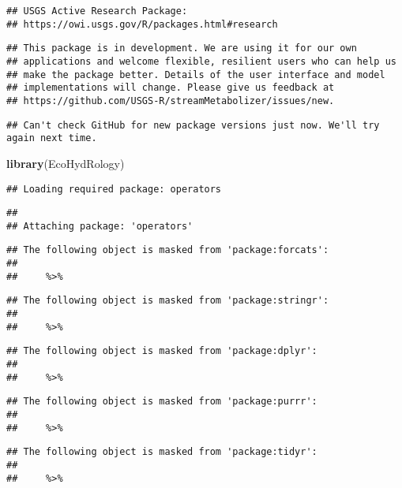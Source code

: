 \documentclass[]{article}
\newenvironment{Shaded}{\begin{snugshade}}{\end{snugshade}}
\newcommand{\KeywordTok}[1]{\textcolor[rgb]{0.13,0.29,0.53}{\textbf{#1}}}
\newcommand{\NormalTok}[1]{#1}
\begin{document}
\begin{verbatim}
## USGS Active Research Package:
## https://owi.usgs.gov/R/packages.html#research
\end{verbatim}

\begin{verbatim}
## This package is in development. We are using it for our own
## applications and welcome flexible, resilient users who can help us
## make the package better. Details of the user interface and model
## implementations will change. Please give us feedback at
## https://github.com/USGS-R/streamMetabolizer/issues/new.
\end{verbatim}

\begin{verbatim}
## Can't check GitHub for new package versions just now. We'll try again next time.
\end{verbatim}

\begin{Shaded}
\begin{Highlighting}[]
\KeywordTok{library}\NormalTok{(EcoHydRology)}
\end{Highlighting}
\end{Shaded}

\begin{verbatim}
## Loading required package: operators
\end{verbatim}

\begin{verbatim}
## 
## Attaching package: 'operators'
\end{verbatim}

\begin{verbatim}
## The following object is masked from 'package:forcats':
## 
##     %>%
\end{verbatim}

\begin{verbatim}
## The following object is masked from 'package:stringr':
## 
##     %>%
\end{verbatim}

\begin{verbatim}
## The following object is masked from 'package:dplyr':
## 
##     %>%
\end{verbatim}

\begin{verbatim}
## The following object is masked from 'package:purrr':
## 
##     %>%
\end{verbatim}

\begin{verbatim}
## The following object is masked from 'package:tidyr':
## 
##     %>%
\end{verbatim}
\end{document}
